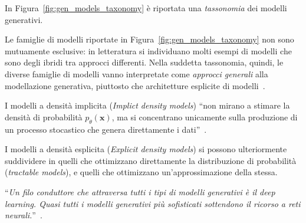 \noindent In Figura~\ref{fig:gen_models_taxonomy} è riportata una \emph{tassonomia} dei modelli generativi.

\begin{oss}
Le famiglie di modelli riportate in Figura~\ref{fig:gen_models_taxonomy} non sono mutuamente esclusive: 
in letteratura si individuano molti esempi di modelli che sono degli ibridi tra approcci differenti.
Nella suddetta tassonomia, quindi, le diverse famiglie di modelli vanno interpretate come \emph{approcci generali} alla modellazione generativa, piuttosto 
che architetture esplicite di modelli~\cite{fosterGenerativeDeepLearning2023}.
\end{oss}

\noindent I modelli a densità implicita (\emph{Implict density models}) “non mirano a stimare la densità 
di probabilità $p_\theta(\mathbf{x})$, ma si concentrano unicamente sulla produzione di un processo stocastico 
che genera direttamente i dati”~\cite{fosterGenerativeDeepLearning2023}.

\medskip
\noindent I modelli a densità esplicita (\emph{Explicit density models}) si possono ulteriormente suddividere in quelli che ottimizzano direttamente 
la distribuzione di probabilità (\emph{tractable models}), e quelli che ottimizzano un'approssimazione della stessa.

\medskip
\noindent “\emph{Un filo conduttore che attraversa tutti i tipi di modelli generativi è il deep learning.
 Quasi tutti i modelli generativi più sofisticati sottendono il ricorso a reti neurali.}”~\cite{fosterGenerativeDeepLearning2023}.
